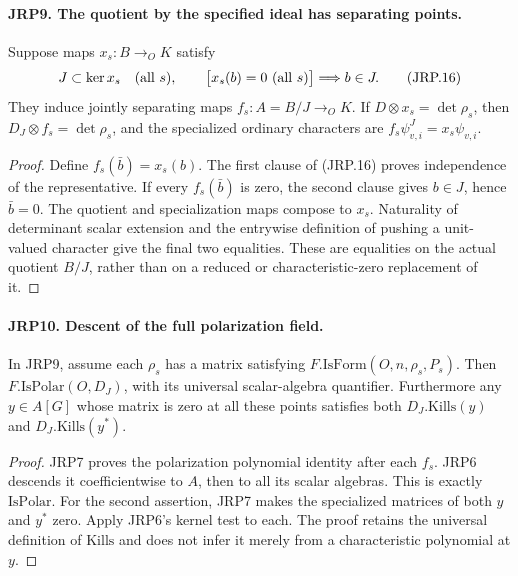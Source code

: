 \documentclass[11pt,a4paper]{article}
\numberwithin{equation}{section}
\theoremstyle{remark}\newtheorem{remark}[theorem]{Remark}
\begin{document}
\paragraph{JRP9. The quotient by the specified ideal has separating points.}
\label{claim:JRP9}
Suppose maps \(x_s:B\to_O K\) satisfy
\[
 J\subset\ker x_s\quad(\hbox{all }s),\qquad
       \bigl[x_s(b)=0\ (\hbox{all }s)\bigr]\Longrightarrow b\in J.
 \tag{JRP.16}
\]
They induce jointly separating maps \(f_s:A=B/J\to_O K\).
If \(D\otimes x_s=\det\rho_s\), then
\(D_J\otimes f_s=\det\rho_s\), and the specialized ordinary
characters are \(f_s\psi^J_{v,i}=x_s\psi_{v,i}\).
\begin{proof}
Define \(f_s(\bar b)=x_s(b)\).  The first clause of
(JRP.16) proves independence of the representative.  If every
\(f_s(\bar b)\) is zero, the second clause gives \(b\in J\),
hence \(\bar b=0\).  The quotient and specialization maps
compose to \(x_s\).  Naturality of determinant scalar extension
and the entrywise definition of pushing a unit-valued character
give the final two equalities.  These are equalities on the actual
quotient \(B/J\), rather than on a reduced or characteristic-zero
replacement of it.
\end{proof}

\paragraph{JRP10. Descent of the full polarization field.}
\label{claim:JRP10}
In JRP9, assume each \(\rho_s\) has a matrix satisfying
\(F.\mathrm{IsForm}(O,n,\rho_s,P_s)\).  Then
\(F.\mathrm{IsPolar}(O,D_J)\), with its universal scalar-algebra
quantifier.  Furthermore any \(y\in A[G]\) whose matrix is zero
at all these points satisfies both
\(D_J.\mathrm{Kills}(y)\) and \(D_J.\mathrm{Kills}(y^*)\).
\begin{proof}
JRP7 proves the polarization polynomial identity after each
\(f_s\).  JRP6 descends it coefficientwise to \(A\), then to
all its scalar algebras.  This is exactly \(\mathrm{IsPolar}\).
For the second assertion, JRP7 makes the specialized matrices of
both \(y\) and \(y^*\) zero.  Apply JRP6's kernel test to each.
The proof retains the universal definition of \(\mathrm{Kills}\)
and does not infer it merely from a characteristic polynomial at
\(y\).
\end{proof}

\end{document}
